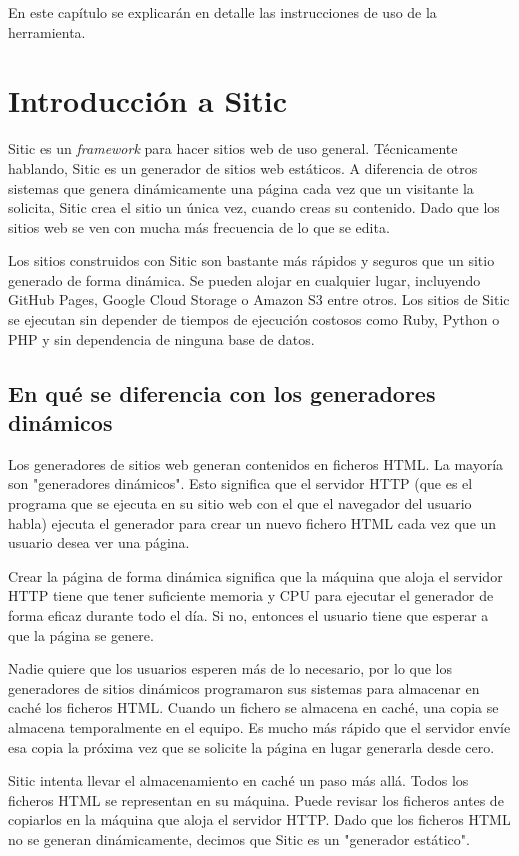 En este capítulo se explicarán en detalle las instrucciones de uso de la herramienta.

\section{Introducción a Sitic}

Sitic es un \textit{framework} para hacer sitios web de uso general. Técnicamente hablando, Sitic es un generador de sitios web estáticos.
A diferencia de otros sistemas que genera dinámicamente una página cada vez que un visitante la solicita, Sitic crea el sitio
un única vez,
cuando creas su contenido. Dado que los sitios web se ven con mucha más frecuencia de lo que se edita.

Los sitios construidos con Sitic son bastante más rápidos y seguros que un sitio generado de forma dinámica.
Se pueden alojar en cualquier lugar, incluyendo GitHub Pages, Google Cloud Storage o Amazon
S3 entre otros. Los sitios de Sitic se ejecutan sin depender de tiempos de ejecución costosos como Ruby, Python
o PHP y sin dependencia de ninguna base de datos.

\subsection{En qué se diferencia con los generadores dinámicos}

Los generadores de sitios web generan contenidos en ficheros HTML. La mayoría son "generadores dinámicos".
Esto significa que el servidor HTTP (que es el programa que se ejecuta en su sitio web con el que el navegador del
usuario habla) ejecuta el generador para crear un nuevo fichero HTML cada vez que un usuario desea ver una página.

Crear la página de forma dinámica significa que la máquina que aloja el servidor HTTP tiene que tener suficiente
memoria y CPU para ejecutar el generador de forma eficaz durante todo el día. Si no, entonces el usuario tiene que
esperar a que la página se genere.

Nadie quiere que los usuarios esperen más de lo necesario, por lo que los generadores de sitios dinámicos programaron
sus sistemas para almacenar en caché los ficheros HTML. Cuando un fichero se almacena en caché, una copia se
almacena temporalmente en el equipo. Es mucho más rápido que el servidor envíe esa copia la próxima vez que
se solicite la página en lugar generarla desde cero.

Sitic intenta llevar el almacenamiento en caché un paso más allá. Todos los ficheros HTML se representan en su máquina.
Puede revisar los ficheros antes de copiarlos en la máquina que aloja el servidor HTTP. Dado que los ficheros HTML
no se generan dinámicamente, decimos que Sitic es un "generador estático".


